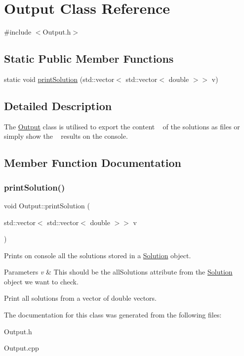 \hypertarget{class_output}{}\section{Output Class Reference}
\label{class_output}


{\ttfamily \#include $<$Output.\+h$>$}

\subsection*{Static Public Member Functions}
\begin{DoxyCompactItemize}
\item 
static void \hyperlink{class_output_a97f96caf0cafae93dad6f4faedb1fe25}{print\+Solution} (std\+::vector$<$ std\+::vector$<$ double $>$$>$ v)
\end{DoxyCompactItemize}


\subsection{Detailed Description}
The \hyperlink{class_output}{Output} class is utilised to export the content ~\newline
 of the solutions as files or simply show the ~\newline
 results on the console. 

\subsection{Member Function Documentation}
\mbox{\label{class_output_a97f96caf0cafae93dad6f4faedb1fe25}} 
\subsubsection{\texorpdfstring{print\+Solution()}{printSolution()}}
{\footnotesize\ttfamily void Output\+::print\+Solution (\begin{DoxyParamCaption}\item[{std\+::vector$<$ std\+::vector$<$ double $>$$>$}]{v }\end{DoxyParamCaption})\hspace{0.3cm}{\ttfamily [static]}}

Prints on console all the solutions stored in a \hyperlink{class_solution}{Solution} object. 
\begin{DoxyParams}{Parameters}
{\em v} & This should be the all\+Solutions attribute from the \hyperlink{class_solution}{Solution} object we want to check.\\
\hline
\end{DoxyParams}
Print all solutions from a vector of double vectors. 

The documentation for this class was generated from the following files\+:\begin{DoxyCompactItemize}
\item 
Output.\+h\item 
Output.\+cpp\end{DoxyCompactItemize}
